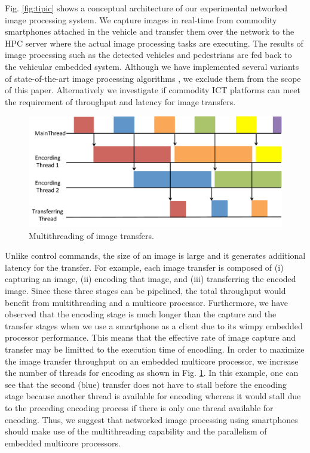Fig. \ref{fig:tipic} shows a conceptual architecture of our experimental
networked image processing system.
We capture images in real-time from commodity smartphones attached in
the vehicle and transfer them over the network to the HPC server where
the actual image processing tasks are executing.
The results of image processing such as the detected vehicles and
pedestrians are fed back to the vehicular embedded system.
Although we have implemented several variants of state-of-the-art image
processing algorithms \cite{Hirabayashi13}, we exclude them from the
scope of this paper.
Alternatively we investigate if commodity ICT platforms can meet the
requirement of throughput and latency for image transfers.

\begin{figure}[!t]
 \centering
 \includegraphics[width=\hsize]{fig/multithread.pdf}
 \caption{Multithreading of image transfers.}
 \label{fig:multithread}
\end{figure}

Unlike control commands, the size of an image is large and it generates
additional latency for the transfer.
For example, each image transfer is composed of (i) capturing an image,
(ii) encoding that image, and (iii) transferring the encoded image.
Since these three stages can be pipelined, the total throughput would
benefit from multithreading and a multicore processor.
Furthermore, we have observed that the encoding stage is much longer
than the capture and the transfer stages when we use a smartphone as a
client due to its wimpy embedded processor performance.
This means that the effective rate of image capture and transfer may be
limitted to the execution time of encodling.
In order to maximize the image transfer throughput on an embedded
multicore processor, we increase the number of threads for encoding as
shown in Fig. \ref{fig:multithread}.
In this example, one can see that the second (blue) transfer does not
have to stall before the encoding stage because another thread is
available for encoding whereas it would stall due to the preceding
encoding process if there is only one thread available for encoding.
Thus, we suggest that networked image processing using smartphones
should make use of the multithreading capability and the parallelism of
embedded multicore processors.
